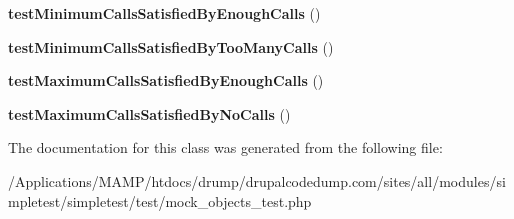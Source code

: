 \begin{DoxyCompactItemize}
\item 
\hypertarget{class_test_of_mock_expectations_that_pass_a1f204b77d2e7e07735d389bf263cad0c}{
{\bfseries testMinimumCallsSatisfiedByEnoughCalls} ()}
\label{class_test_of_mock_expectations_that_pass_a1f204b77d2e7e07735d389bf263cad0c}

\item 
\hypertarget{class_test_of_mock_expectations_that_pass_ab64fec6d71185c020fb59d67ee48691c}{
{\bfseries testMinimumCallsSatisfiedByTooManyCalls} ()}
\label{class_test_of_mock_expectations_that_pass_ab64fec6d71185c020fb59d67ee48691c}

\item 
\hypertarget{class_test_of_mock_expectations_that_pass_ae4e091fd6fc981262edd20ffd46f5486}{
{\bfseries testMaximumCallsSatisfiedByEnoughCalls} ()}
\label{class_test_of_mock_expectations_that_pass_ae4e091fd6fc981262edd20ffd46f5486}

\item 
\hypertarget{class_test_of_mock_expectations_that_pass_a8709d80ed48b650186e0ce274b801e4d}{
{\bfseries testMaximumCallsSatisfiedByNoCalls} ()}
\label{class_test_of_mock_expectations_that_pass_a8709d80ed48b650186e0ce274b801e4d}

\end{DoxyCompactItemize}


The documentation for this class was generated from the following file:\begin{DoxyCompactItemize}
\item 
/Applications/MAMP/htdocs/drump/drupalcodedump.com/sites/all/modules/simpletest/simpletest/test/mock\_\-objects\_\-test.php\end{DoxyCompactItemize}
